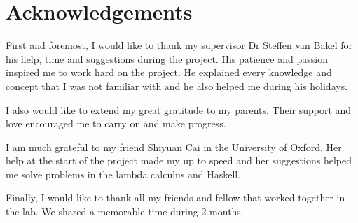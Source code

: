 \chapter*{Acknowledgements}

First and foremost, I would like to thank my supervisor Dr Steffen van Bakel for his help, time and suggestions during the project. His patience and passion inspired me to work hard on the project. He explained every knowledge and concept that I was not familiar with and he also helped me during his holidays.  

I also would like to extend my great gratitude to my parents. Their support and love encouraged me to carry on and make progress.

I am much grateful to my friend Shiyuan Cai in the University of Oxford. Her help at the start of the project made my up to speed and her suggestions helped me solve problems in the lambda calculus and Haskell. 

Finally, I would like to thank all my friends and fellow that worked together in the lab. We shared a memorable time during 2 months.